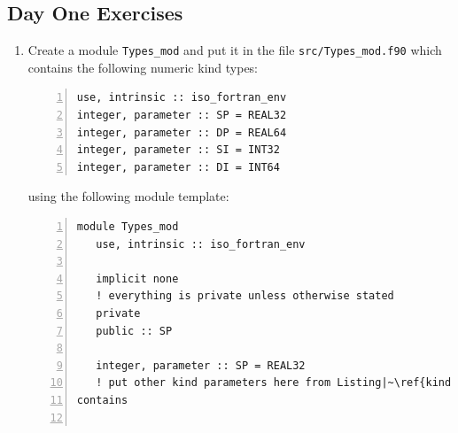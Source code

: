 \documentclass[12pt]{article}
\begin{document}
\subsection*{Day One Exercises}
\setdefaultleftmargin{0pt}{}{}{}{}{}
\begin{enumerate}
\item Create a module \texttt{Types\_mod} and put it in the file \texttt{src/Types\_mod.f90} which 
contains the following numeric kind types:
\begin{lstlisting}[numbers=left,numberstyle=\footnotesize\color{gray},caption={Kind parameters},captionpos=b,showstringspaces=false,label={kind:params},columns=fullflexible,basicstyle=\ttfamily,keywordstyle=\color{blue}\ttfamily,stringstyle=\color{red}\ttfamily,commentstyle=\color{green}\ttfamily,language={[08]Fortran},escapechar=|]
use, intrinsic :: iso_fortran_env
integer, parameter :: SP = REAL32
integer, parameter :: DP = REAL64
integer, parameter :: SI = INT32
integer, parameter :: DI = INT64
\end{lstlisting}
using the following module template: 
\begin{lstlisting}[numbers=left,numberstyle=\footnotesize\color{gray},caption={Module template},captionpos=b,showstringspaces=false,label={mod:template},columns=fullflexible,basicstyle=\ttfamily,keywordstyle=\color{blue}\ttfamily,stringstyle=\color{red}\ttfamily,commentstyle=\color{green}\ttfamily,language={[08]Fortran},escapechar=|]
module Types_mod
   use, intrinsic :: iso_fortran_env

   implicit none
   ! everything is private unless otherwise stated
   private 
   public :: SP

   integer, parameter :: SP = REAL32
   ! put other kind parameters here from Listing|~\ref{kind:params}|
contains


\end{lstlisting}
\end{enumerate}
\end{document}
